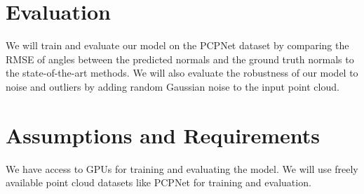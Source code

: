 \documentclass{article}
\begin{document}
\section{Evaluation}
We will train and evaluate our model on the PCPNet dataset by comparing the RMSE of angles between the predicted normals and the ground truth normals to the state-of-the-art methods. We will also evaluate the robustness of our model to noise and outliers by adding random Gaussian noise to the input point cloud.

\section{Assumptions and Requirements}
We have access to GPUs for training and evaluating the model. We will use freely available point cloud datasets like PCPNet for training and evaluation.

\printbibliography
\end{document}
